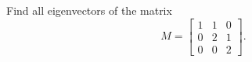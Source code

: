 \begin{exercise}
  \label{ex:hw06:triangular-matrix-eigenvectors}
  Find all eigenvectors of the matrix
  \[
    M=\begin{bmatrix}
      1&1&0\\
      0&2&1\\
      0&0&2
    \end{bmatrix}.
  \]
\end{exercise}
